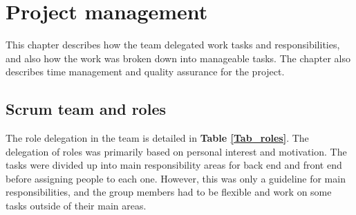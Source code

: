
\chapter{Project management}

This chapter describes how the team delegated work tasks and responsibilities, and also how the work was broken down into manageable tasks. The chapter also describes time management and quality assurance for the project.

\section{Scrum team and roles}

The role delegation in the team is detailed in \textbf{Table \ref{Tab_roles}}. The delegation of roles was primarily based on personal interest and motivation. The tasks were divided up into main responsibility areas for back end and front end before assigning people to each one. However, this was only  a guideline for main responsibilities, and the group members had to be flexible and work on some tasks outside of their main areas.

